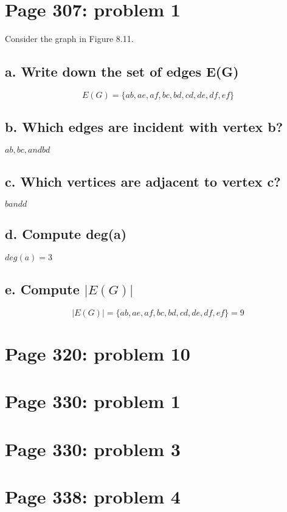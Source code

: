 \documentclass[]{article}
\begin{document}
\section{Page 307: problem 1}\label{page-307-problem-1}

Consider the graph in Figure 8.11.

\subsection{a. Write down the set of edges
E(G)}\label{a.-write-down-the-set-of-edges-eg}

\[E(G) = \{ab, ae, af, bc, bd, cd, de, df, ef\}\]

\subsection{b. Which edges are incident with vertex
b?}\label{b.-which-edges-are-incident-with-vertex-b}

\(ab, bc, and bd\)

\subsection{c. Which vertices are adjacent to vertex
c?}\label{c.-which-vertices-are-adjacent-to-vertex-c}

\(b and d\)

\subsection{d. Compute deg(a)}\label{d.-compute-dega}

\(deg(a) = 3\)

\subsection{\texorpdfstring{e. Compute
\(|E(G)|\)}{e. Compute \textbar{}E(G)\textbar{}}}\label{e.-compute-eg}

\[|E(G)|= \{ab, ae, af, bc, bd, cd, de, df, ef\} = 9\]

\section{Page 320: problem 10}\label{page-320-problem-10}

\section{Page 330: problem 1}\label{page-330-problem-1}

\section{Page 330: problem 3}\label{page-330-problem-3}

\section{Page 338: problem 4}\label{page-338-problem-4}
\end{document}
